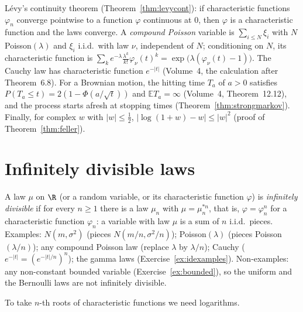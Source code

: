 \begin{reminder}
L\'evy's continuity theorem (Theorem~\ref{thm:levycont}): if characteristic functions $\varphi_n$ converge pointwise to a function $\varphi$ continuous at $0$,
then $\varphi$ is a characteristic function and the laws converge. A \emph{compound Poisson} variable is $\sum_{i\le N}\xi_i$ with $N$ Poisson$(\lambda)$
and $\xi_i$ i.i.d.\ with law $\nu$, independent of $N$; conditioning on $N$, its characteristic function is
$\sum_k e^{-\lambda}\frac{\lambda^k}{k!}\varphi_\nu(t)^k=\exp\bigl(\lambda(\varphi_\nu(t)-1)\bigr)$. The Cauchy law has characteristic function $e^{-|t|}$
(Volume~4, the calculation after Theorem~6.8). For a Brownian motion, the hitting time $T_a$ of $a>0$ satisfies $P(T_a\le t)=2(1-\Phi(a/\sqrt t))$ and $\mathbb ET_a=\infty$
(Volume~4, Theorem~12.12), and the process starts afresh at stopping times (Theorem~\ref{thm:strongmarkov}). Finally, for complex $w$ with $|w|\le\frac12$,
$|\log(1+w)-w|\le|w|^2$ (proof of Theorem~\ref{thm:feller}).
\end{reminder}

\section{Infinitely divisible laws}

A law $\mu$ on $\R$ (or a random variable, or its characteristic function $\varphi$) is \emph{infinitely divisible} if for every $n\ge1$ there is a law $\mu_n$
with $\mu=\mu_n^{*n}$, that is, $\varphi=\varphi_n^n$ for a characteristic function $\varphi_n$: a variable with law $\mu$ is a sum of $n$ i.i.d.\ pieces.
Examples: $N(m,\sigma^2)$ (pieces $N(m/n,\sigma^2/n)$); Poisson$(\lambda)$ (pieces Poisson$(\lambda/n)$); any compound Poisson law (replace $\lambda$ by $\lambda/n$);
Cauchy ($e^{-|t|}=(e^{-|t|/n})^n$); the gamma laws (Exercise~\ref{ex:idexamples}). Non-examples: any non-constant bounded variable
(Exercise~\ref{ex:bounded}), so the uniform and the Bernoulli laws are not infinitely divisible.

To take $n$-th roots of characteristic functions we need logarithms.

